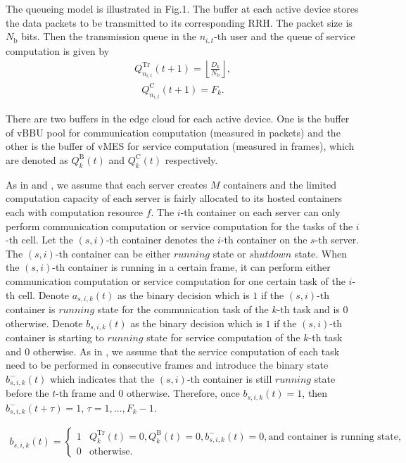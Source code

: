 The queueing model is illustrated in Fig.1.
The buffer at each active device stores the data packets to be transmitted to its corresponding RRH. The packet size is ${N_\mathrm{b}}$ bits. Then the transmission queue in the $n_{i,t}$-th user and the queue of service computation is given by
\begin{align}
    Q_{n_{i,t}}^{\mathrm{Tr}}(t+1)=\left\lfloor\frac{D_{k}}{N_\mathrm{b}}\right\rfloor,
\end{align}
\begin{align}
    Q_{n_{i,t}}^{\mathrm{C}}(t+1)=F_{k}.
\end{align}

There are two buffers in the edge cloud for each active device. One is the buffer of vBBU pool for communication computation (measured in packets) and the other is the buffer of vMES for service computation (measured in frames), which are denoted as $Q_{k}^{\mathrm{B}}(t)$ and $Q_{k}^{\mathrm{C}}(t)$ respectively.

As in  and , we assume that each server creates $M$ containers and the limited computation capacity of each server is fairly allocated to its hosted containers each with computation resource $f$. The $i$-th container on each server can only perform communication computation or service computation for the tasks of the $i$-th cell. Let the $(s,i)$-th container denotes the $i$-th container on the $s$-th server. The $(s,i)$-th container can be either $\textit{running}$ state or $\textit{shutdown}$ state. When the $(s,i)$-th container is running in a certain frame, it can perform either communication computation or service computation for one certain task of the $i$-th cell. Denote $a_{s,i,k}(t)$ as the binary decision which is $1$ if the $(s,i)$-th container is $\textit{running}$ state for the communication task of the $k$-th task and is $0$ otherwise. Denote $b_{s,i,k}(t)$ as the binary decision which is $1$ if the $(s,i)$-th container is starting to $\textit{running}$ state for service computation of the $k$-th task and $0$ otherwise. As in \cite{}, we assume that the service computation of each task need to be performed in consecutive frames and introduce the binary state $b_{s,i,k}^{-}(t)$ which indicates that the $(s,i)$-th container is still $\textit{running}$ state before the $t$-th frame and $0$ otherwise. Therefore, once $b_{s,i,k}(t)=1$, then $b_{s,i,k}^{-}(t+\tau)=1$, $\tau=1,\ldots,F_{k}-1$.

\begin{align}
    b_{s,i,k}(t)=
    \begin{cases}
        1 &Q_{k}^{\mathrm{Tr}}(t)=0,Q_{k}^{\mathrm{B}}(t)=0,b_{s,i,k}^{-}(t)=0,\text{and container is running state,}\\
        0 &\text{otherwise}.
    \end{cases}
\end{align}

